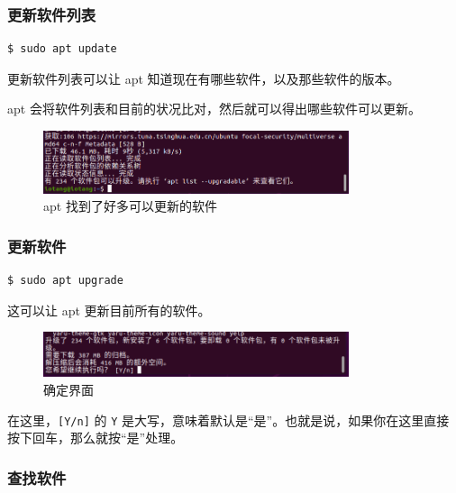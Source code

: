 \documentclass[UTF-8]{ctexart}
\begin{document}
			\subsubsection{更新软件列表}
				
				\begin{verbatim}
$ sudo apt update
				\end{verbatim}
			
				更新软件列表可以让 apt 知道现在有哪些软件，以及那些软件的版本。
				
				apt 会将软件列表和目前的状况比对，然后就可以得出哪些软件可以更新。
				
				\begin{figure}[H]
					\centering
					\includegraphics[width=0.8\textwidth]{fig/apt_update.png}
					\caption*{apt 找到了好多可以更新的软件}
				\end{figure}
			
			\subsubsection{更新软件}
	
				\begin{verbatim}
$ sudo apt upgrade
				\end{verbatim}
				
				这可以让 apt 更新目前所有的软件。
				
				\begin{figure}[H]
					\centering
					\includegraphics[width=0.8\textwidth]{fig/apt_upgrade_yn.png}
					\caption*{确定界面}
				\end{figure}
			
				在这里，\texttt{[Y/n]} 的 \texttt{Y} 是大写，意味着默认是“是”。也就是说，如果你在这里直接按下回车，那么就按“是”处理。
				
			\subsubsection{查找软件}
				
\end{document}
